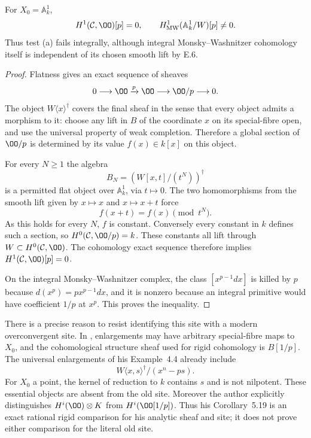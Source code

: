 \begin{proposition}\label{prop:DE-old-site}
For $X_0=\mathbb A^1_k$,
\[
 H^1(\mathcal C,\OO)[p]=0,
 \qquad
 H^1_{\rm MW}(\mathbb A^1_k/W)[p]\ne0.
\]
Thus test (a) fails integrally, although integral Monsky--Washnitzer cohomology itself is independent of its chosen smooth lift by E.6.
\end{proposition}
\begin{proof}
Flatness gives an exact sequence of sheaves
\[
          0\longrightarrow\OO\xrightarrow p\OO
                    \longrightarrow\OO/p\longrightarrow0.
\]
The object $W\langle x\rangle^\dagger$ covers the final sheaf in the sense that every object admits a morphism to it: choose any lift in $B$ of the coordinate $x$ on its special-fibre open, and use the universal property of weak completion.  Therefore a global section of $\OO/p$ is determined by its value $f(x)\in k[x]$ on this object.

For every $N\geq1$ the algebra
\[
                    B_N=(W[x,t]/(t^N))^\dagger
\]
is a permitted flat object over $\mathbb A^1_k$, via $t\mapsto0$.  The two homomorphisms from the smooth lift given by $x\mapsto x$ and $x\mapsto x+t$ force
\[
                      f(x+t)=f(x)\pmod {t^N}.
\]
As this holds for every $N$, $f$ is constant.  Conversely every constant in $k$ defines such a section, so $H^0(\mathcal C,\OO/p)=k$.  These constants all lift through $W\subset H^0(\mathcal C,\OO)$.  The cohomology exact sequence therefore implies $H^1(\mathcal C,\OO)[p]=0$.

On the integral Monsky--Washnitzer complex, the class $[x^{p-1}dx]$ is killed by $p$ because $d(x^p)=p x^{p-1}dx$, and it is nonzero because an integral primitive would have coefficient $1/p$ at $x^p$.  This proves the inequality.
\end{proof}

There is a precise reason to resist identifying this site with a modern overconvergent site.  In \cite[Definitions~3.1, 3.7; Example~3.8(ii)]{Zhang2019}, enlargements may have arbitrary special-fibre maps to $X_0$, and the cohomological structure sheaf used for rigid cohomology is $B[1/p]$.  The universal enlargements of his Example~4.4 already include
\[
       W\langle x,s\rangle^\dagger/(x^n-ps).
\]
For $X_0$ a point, the kernel of reduction to $k$ contains $s$ and is not nilpotent.  These essential objects are absent from the old site.  Moreover the author explicitly distinguishes $H^i(\OO)\otimes K$ from $H^i(\OO[1/p])$.  Thus his Corollary~5.19 is an exact rational rigid comparison for his analytic sheaf and site; it does not prove either comparison for the literal old site.


